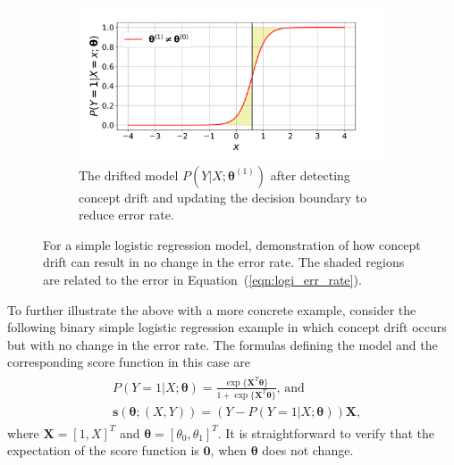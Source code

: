 \documentclass[twoside,11pt]{article}
\begin{document}
\begin{figure}[!htbp]
  \begin{subfigure}[t]{0.4\linewidth}
         \centering
	 \includegraphics[width=\textwidth, trim=.2in .2in .7in .45in, clip]{../figures/v14/demons_fig/2D_logi_cd_updated.png}
         \captionsetup{width=.95\linewidth}
         \caption{The drifted model $P(Y|{X};\bm{\theta}^{(1)})$ after detecting concept drift and updating the decision boundary to reduce error rate.}
         \label{fig:logi_err_rate_unch_d}
  \end{subfigure}
  \caption{For a simple logistic regression model, demonstration of how concept drift can result in no change in the error rate. The shaded regions are related to the error in Equation~(\ref{eqn:logi_err_rate}).}
  \label{fig:logi_err_rate_unch}
\end{figure}

To further illustrate the above with a more concrete example, consider the following binary simple logistic regression example in which concept drift occurs but with no change in the error rate. The formulas defining the model and the corresponding score function in this case are
\begin{align}
\begin{aligned}
&P(Y=1|{X};\bm{\theta}) = \frac{\exp\{\bm {X}^{T} \bm {\theta}\}}{1+\exp\{\bm {X}^{T} \bm {\theta}\}}\text{,~and} \\
&\bm {s}(\bm { \theta} ; ( {X}, Y)) = (Y-P(Y=1|{X};\bm{\theta}))\bm {X},
\end{aligned}
\label{eqn:logi_mod_score}
\end{align}
where $\bm{X} = [1, X]^T$ and $\bm{\theta}=[\theta_0, \theta_1]^T$. It is straightforward to verify that the expectation of the score function is $\bm {0}$, when $\bm{\theta}$ does not change.
\end{document}
